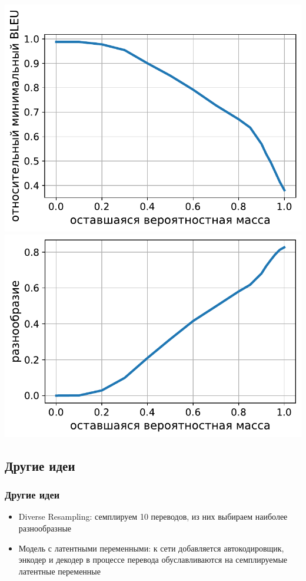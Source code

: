 \documentclass[unicode]{beamer}
\begin{document}
\begin{frame}
\begin{center}
\includegraphics[scale=0.25]{min-bleu-nucleus-sampling.pdf}
\includegraphics[scale=0.25]{diversity-nucleus-sampling.pdf}
\end{center}
\end{frame}


\subsection{Другие идеи}
\begin{frame}
\frametitle{Другие идеи}
\begin{itemize}
    \item Diverse Resampling: семплируем 10 переводов, из них выбираем наиболее разнообразные \newline
    \item Модель с латентными переменными: к сети добавляется автокодировщик, энкодер и декодер в процессе перевода обуславливаются на семплируемые латентные переменные
\end{itemize}
\end{frame}
\end{document}

